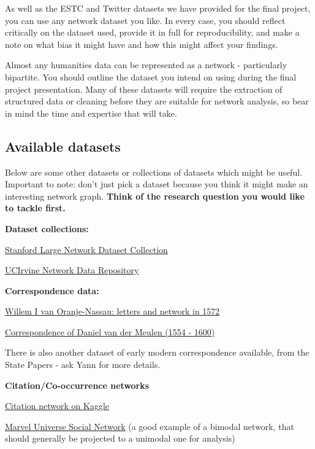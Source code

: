 \documentclass[
]{book}
\begin{document}
As well as the ESTC and Twitter datasets we have provided for the final project, you can use any network dataset you like. In every case, you should reflect critically on the dataset used, provide it in full for reproducibility, and make a note on what bias it might have and how this might affect your findings.

Almost any humanities data can be represented as a network - particularly bipartite. You should outline the dataset you intend on using during the final project presentation. Many of these datasets will require the extraction of structured data or cleaning before they are suitable for network analysis, so bear in mind the time and expertise that will take.

\hypertarget{available-datasets}{%
\subsection{Available datasets}\label{available-datasets}}

Below are some other datasets or collections of datasets which might be useful. Important to note: don't just pick a dataset because you think it might make an interesting network graph. \textbf{Think of the research question you would like to tackle first.}

\textbf{Dataset collections:}

\href{http://snap.stanford.edu/data/index.html}{Stanford Large Network Dataset Collection}

\href{https://networkdata.ics.uci.edu/}{UCIrvine Network Data Repository}

\textbf{Correspondence data:}

\href{https://dataverse.nl/dataset.xhtml?persistentId=doi:10.34894/ZSIKRI}{Willem I van Oranje-Nassau: letters and network in 1572}

\href{https://github.com/jessesadler/dvdm-correspondence}{Correspondence of Daniel van der Meulen (1554 - 1600)}

There is also another dataset of early modern correspondence available, from the State Papers - ask Yann for more details.

\textbf{Citation/Co-occurrence networks}

\href{https://www.kaggle.com/datasets/mathurinache/citation-network-dataset}{Citation network on Kaggle}

\href{https://www.kaggle.com/datasets/csanhueza/the-marvel-universe-social-network}{Marvel Universe Social Network} (a good example of a bimodal network, that should generally be projected to a unimodal one for analysis)
\end{document}
